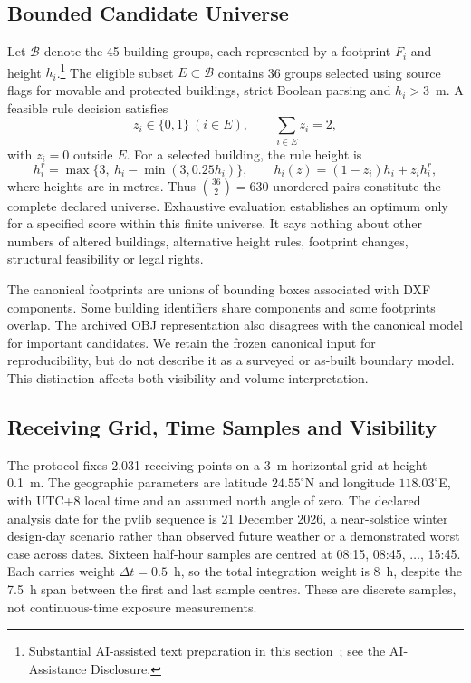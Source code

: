 \documentclass{llncs}
\newcommand{\aidraft}{\footnote{Substantial AI-assisted text preparation in this section~\cite{openai2026}; see the AI-Assistance Disclosure.}}
\begin{document}
\subsection{Bounded Candidate Universe}
Let $\mathcal{B}$ denote the 45 building groups, each represented by a footprint $F_i$ and height $h_i$.\aidraft{} The eligible subset $E\subset\mathcal{B}$ contains 36 groups selected using source flags for movable and protected buildings, strict Boolean parsing and $h_i>3$~m. A feasible rule decision satisfies
\begin{equation}
 z_i\in\{0,1\}\ (i\in E),\qquad \sum_{i\in E}z_i=2,
 \label{eq:select}
\end{equation}
with $z_i=0$ outside $E$. For a selected building, the rule height is
\begin{equation}
 h_i^r=\max\{3,\ h_i-\min(3,0.25h_i)\},\qquad
 h_i(z)=(1-z_i)h_i+z_i h_i^r, \label{eq:height}
\end{equation}
where heights are in metres. Thus $\binom{36}{2}=630$ unordered pairs constitute the complete declared universe. Exhaustive evaluation establishes an optimum only for a specified score within this finite universe. It says nothing about other numbers of altered buildings, alternative height rules, footprint changes, structural feasibility or legal rights.

The canonical footprints are unions of bounding boxes associated with DXF components. Some building identifiers share components and some footprints overlap. The archived OBJ representation also disagrees with the canonical model for important candidates. We retain the frozen canonical input for reproducibility, but do not describe it as a surveyed or as-built boundary model. This distinction affects both visibility and volume interpretation.

\subsection{Receiving Grid, Time Samples and Visibility}
The protocol fixes 2,031 receiving points on a 3~m horizontal grid at height 0.1~m. The geographic parameters are latitude $24.55^\circ$N and longitude $118.03^\circ$E, with UTC+8 local time and an assumed north angle of zero. The declared analysis date for the pvlib sequence is 21 December 2026, a near-solstice winter design-day scenario rather than observed future weather or a demonstrated worst case across dates. Sixteen half-hour samples are centred at 08:15, 08:45, $\ldots$, 15:45. Each carries weight $\Delta t=0.5$~h, so the total integration weight is 8~h, despite the 7.5~h span between the first and last sample centres. These are discrete samples, not continuous-time exposure measurements.
\end{document}
